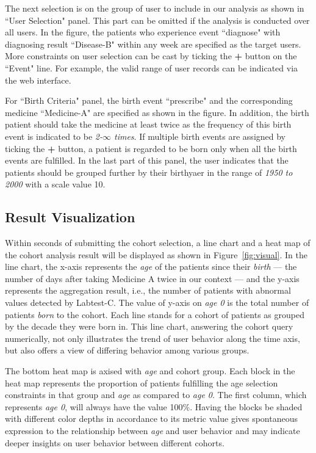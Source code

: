 \documentclass[10pt,conference,letterpaper]{IEEEtran}
\begin{document}
The next selection is on the group of user to include in our analysis as shown in ``User Selection" panel. This part can be omitted if the analysis is conducted over all users. 
In the figure, the patients who experience event ``diagnose" with diagnosing result ``Disease-B" within any week are specified as the target users.
More constraints on user selection can be cast by ticking the \textbf{+} button on the ``Event" line.
For example, the valid range of user records can be indicated via the web interface.

For ``Birth Criteria" panel, the birth event ``prescribe" and the corresponding medicine ``Medicine-A" are specified as shown in the figure.
In addition, the birth patient should take the medicine at least twice as the frequency of this birth event is indicated to be \emph{2-$\infty$ times}.
If multiple birth events are assigned by ticking the \textbf{+} button, a patient is regarded to be born only when all the birth events are fulfilled. 
In the last part of this panel, the user indicates that the patients should be grouped further by their birthyaer in the range of \emph{1950 to 2000} with a scale value 10.

\subsection{Result Visualization}

Within seconds of submitting the cohort selection, a line chart and a heat map of the cohort analysis result will be displayed as shown in Figure~\ref{fig:visual}. In the line chart, the x-axis represents the \emph{age} of the patients since their \emph{birth} --- the number of days after taking Medicine A twice in our context --- and the y-axis represents the aggregation result, i.e., the number of patients with abnormal values detected by Labtest-C. The value of y-axis on \emph{age 0} is the total number of patients \emph{born} to the cohort. 
Each line stands for a cohort of patients as grouped by the decade they were born in. 
This line chart, answering the cohort query numerically, not only illustrates the trend of user behavior along the time axis, but also offers a view of differing behavior among various groups. 

The bottom heat map is axised with \emph{age} and cohort group. 
Each block in the heat map represents the proportion of patients fulfilling the age selection constraints in that group and \emph{age} as compared to \emph{age 0}. 
The first column, which represents \emph{age 0}, will always have the value 100\%. 
Having the blocks be shaded with different color depths in accordance to its metric value gives spontaneous expression to the relationship between \emph{age} and user behavior and may indicate deeper insights on user behavior between different cohorts. 
\end{document}
